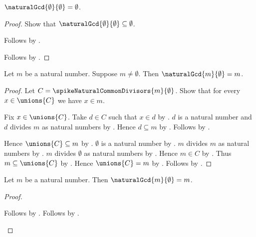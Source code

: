 \begin{proposition}\label{spike15_natural_gcd_zero_zero}
    $\naturalGcd{\emptyset}{\emptyset}=\emptyset$.
\end{proposition}
\begin{proof}
    Show that $\naturalGcd{\emptyset}{\emptyset}\subseteq\emptyset$.
    \begin{subproof}
        Follows by
            .
    \end{subproof}
    Follows by .
\end{proof}

\begin{proposition}\label{spike15_natural_gcd_positive_zero}
    Let $m$ be a natural number.
    Suppose $m\neq\emptyset$.
    Then $\naturalGcd{m}{\emptyset}=m$.
\end{proposition}
\begin{proof}
    Let $C=\spikeNaturalCommonDivisors{m}{\emptyset}$.
    Show that for every $x\in\unions{C}$ we have $x\in m$.
    \begin{subproof}
        Fix $x\in\unions{C}$.
        Take $d\in C$ such that $x\in d$ by .
        $d$ is a natural number and
            $d$ divides $m$ as natural numbers
            by .
        Hence $d\subseteq m$
            by .
        Follows by .
    \end{subproof}
    Hence $\unions{C}\subseteq m$ by .
    $\emptyset$ is a natural number by .
    $m$ divides $m$ as natural numbers
        by .
    $m$ divides $\emptyset$ as natural numbers
        by .
    Hence $m\in C$
        by .
    Thus $m\subseteq\unions{C}$ by .
    Hence $\unions{C}=m$ by .
    Follows by
        .
\end{proof}

\begin{theorem}\label{spike15_natural_gcd_zero_right}
    Let $m$ be a natural number.
    Then $\naturalGcd{m}{\emptyset}=m$.
\end{theorem}
\begin{proof}
    \begin{byCase}
            Follows by .
            Follows by .
    \end{byCase}
\end{proof}

